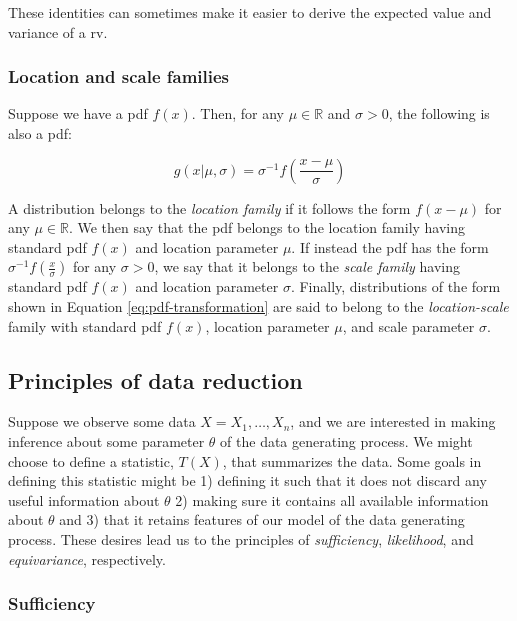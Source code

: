 \documentclass{report}
\begin{document}
These identities can sometimes make it easier to derive the expected value and variance of a \gls{rv}. 

\subsubsection{Location and scale families}

Suppose we have a \gls{pdf} $f(x)$. Then, for any $\mu \in \mathbb{R}$ and $\sigma > 0$, the following is also a \gls{pdf}:

\begin{equation}\label{eq:pdf-transformation}
    g(x | \mu, \sigma) = \sigma^{-1} f\left(\frac{x - \mu}{\sigma}\right)
\end{equation}

A distribution belongs to the \textit{location family} if it follows the form $f(x - \mu)$ for any $\mu \in \mathbb{R}$. We then say that the \gls{pdf} belongs to the location family having standard \gls{pdf} $f(x)$ and location parameter $\mu$. If instead the \gls{pdf} has the form $\sigma^{-1} f\left(\frac{x}{\sigma}\right)$ for any $\sigma > 0$, we say that it belongs to the \textit{scale family} having standard \gls{pdf} $f(x)$ and location parameter $\sigma$. Finally, distributions of the form shown in Equation \ref{eq:pdf-transformation} are said to belong to the \textit{location-scale} family with standard \gls{pdf} $f(x)$, location parameter $\mu$, and scale parameter $\sigma$. 

\subsection{Principles of data reduction}

Suppose we observe some data $X = X_1, \dots, X_n$, and we are interested in making inference about some parameter $\theta$ of the data generating process. We might choose to define a statistic, $T(X)$, that summarizes the data. Some goals in defining this statistic might be 1) defining it such that it does not discard any useful information about $\theta$ 2) making sure it contains all available information about $\theta$ and 3) that it retains features of our model of the data generating process. These desires lead us to the principles of \textit{sufficiency}, \textit{likelihood}, and \textit{equivariance}, respectively. 

\subsubsection{Sufficiency}
\end{document}
